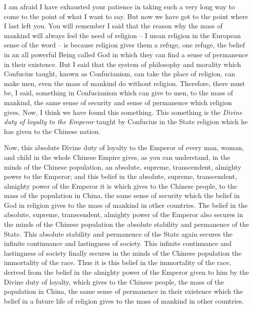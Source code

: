 I am afraid I have exhausted your patience in taking such a very long way to come to the point of what I want to say. But now we have got to the point where I last left you. You will remember I said that the reason why the mass of mankind will always feel the need of religion -- I mean religion in the European sense of the word -- is because religion gives them a refuge, one refuge, the belief in an all powerful Being called God in which they can find a sense of permanence in their existence. But I said that the system of philosophy and morality which Confucius taught, known as Confucianism, can take the place of religion, can make men, even the mass of mankind do without religion. Therefore, there must be, I said, something in Confucianism which can give to men, to the mass of mankind, the same sense of security and sense of permanence which religion gives. Now, I think we have found this something. This something is the \emph{Divine duty of loyalty to the Emperor} taught by Confucius in the State religion which he has given to the Chinese nation.

Now, this absolute Divine duty of loyalty to the Emperor of every man, woman, and child in the whole Chinese Empire gives, as you can understand, in the minds of the Chinese population, an absolute, supreme, transcendent, almighty power to the Emperor; and this belief in the absolute, supreme, transcendent, almighty power of the Emperor it is which gives to the Chinese people, to the mass of the population in China, the same sense of security which the belief in God in religion gives to the mass of mankind in other countries. The belief in the absolute, supreme, transcendent, almighty power of the Emperor also secures in the minds of the Chinese population the absolute stability and permanence of the State. This absolute stability and permanence of the State again secures the infinite continuance and lastingness of society. This infinite continuance and lastingness of society finally secures in the minds of the Chinese population the immortality of the race. Thus it is this belief in the immortality of the race, derived from the belief in the almighty power of the Emperor given to him by the Divine duty of loyalty, which gives to the Chinese people, the mass of the population in China, the same sense of permanence in their existence which the belief in a future life of religion gives to the mass of mankind in other countries.

